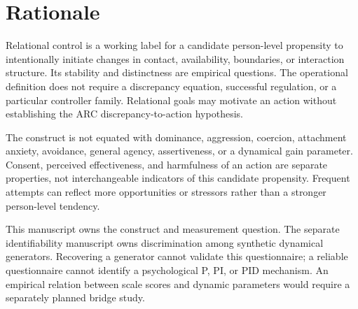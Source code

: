 \section{Rationale}

Relational control is a working label for a candidate person-level propensity to intentionally initiate changes in contact, availability, boundaries, or interaction structure. Its stability and distinctness are empirical questions. The operational definition does not require a discrepancy equation, successful regulation, or a particular controller family. Relational goals may motivate an action without establishing the ARC discrepancy-to-action hypothesis.

The construct is not equated with dominance, aggression, coercion, attachment anxiety, avoidance, general agency, assertiveness, or a dynamical gain parameter. Consent, perceived effectiveness, and harmfulness of an action are separate properties, not interchangeable indicators of this candidate propensity. Frequent attempts can reflect more opportunities or stressors rather than a stronger person-level tendency.

This manuscript owns the construct and measurement question. The separate identifiability manuscript owns discrimination among synthetic dynamical generators. Recovering a generator cannot validate this questionnaire; a reliable questionnaire cannot identify a psychological P, PI, or PID mechanism. An empirical relation between scale scores and dynamic parameters would require a separately planned bridge study.
